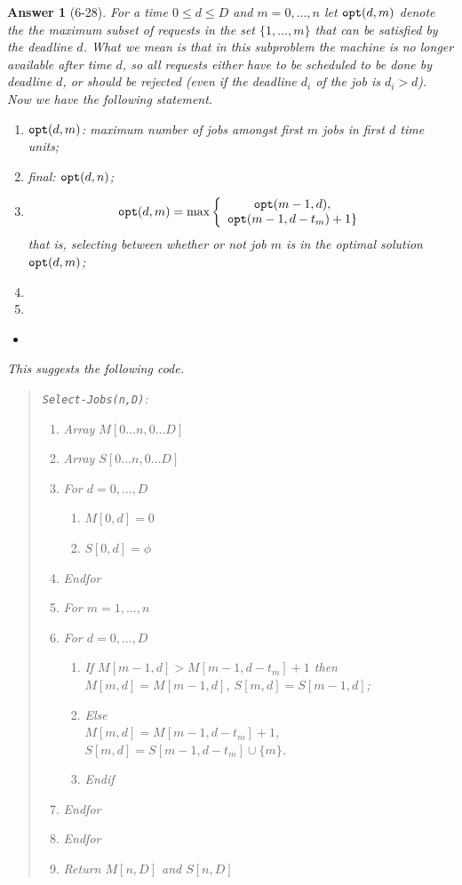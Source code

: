 \documentclass[11pt]{article}
\theoremstyle{numberplain}
\theoremstyle{nonumberplain}
\newtheorem{ans}{Answer}
\newcommand{\opt}[1]{{\tt opt}(}
\newcommand{\0}{{\mathbf{0}}}
\begin{document}
\begin{ans}[6-28]
For a time $0\le d \le D$ and $m=0,\ldots,n$ let 
$\opt(d,m)$ denote the the maximum subset of requests 
in the set $\{1,\ldots,m\}$
that can be satisfied by the deadline $d$. What we mean is that in this 
subproblem the machine is no longer available after time $d$, so all 
requests either have to be scheduled to be done by deadline $d$, or should
be rejected (even if the deadline $d_i$ of the job is $d_i>d$). Now we
have the following statement.
\begin{enumerate}
\item $\opt (d,m)$: maximum number of jobs amongst first $m$ jobs in first $d$ time units;
\item final: $\opt (d,n)$;
\item $$\opt (d,m)=\max\left\{\begin{array}{c}\opt(m-1,d),\\ \opt(m-1,d-t_m)+1\}\end{array}\right.$$
that is, selecting between whether or not job $m$ is in the optimal solution $\opt (d,m)$;
\item 
\item 
\end{enumerate}
\begin{State} \label{jobs-rec}
\begin{itemize}
\item 
\end{itemize}
\end{State}
This suggests the following code.
\begin{quote}
\begin{code}
{\tt Select-Jobs(n,D)}:\\
\begin{enumerate}
\item  Array $M[0\ldots n,0 \ldots D]$
\item  Array $S[0\ldots n,0 \ldots D]$
\item   For $d=0,\ldots,D$
	\begin{enumerate}
\item     $M[0,d]=0$
\item     $S[0,d]=\phi$
	\end{enumerate}
\item    Endfor
\item    For $m=1,\ldots,n$
\item      For $d=0,\ldots,D$
\begin{enumerate}
\item        If $M[m-1,d]>M[m-1,d-t_m]+1$ then \\$M[m,d]=M[m-1,d]$, $S[m,d]=S[m-1,d]$;
\item        Else \\$M[m,d]=M[m-1,d-t_m]+1$, $S[m,d]=S[m-1,d-t_m] \cup\{m\}$.
\item       Endif
\end{enumerate}
\item     Endfor
\item   Endfor
\item   Return $M[n,D]$ and $S[n,D]$
   \end{enumerate}
\end{code}
\end{quote}


\end{ans}
\end{document}
